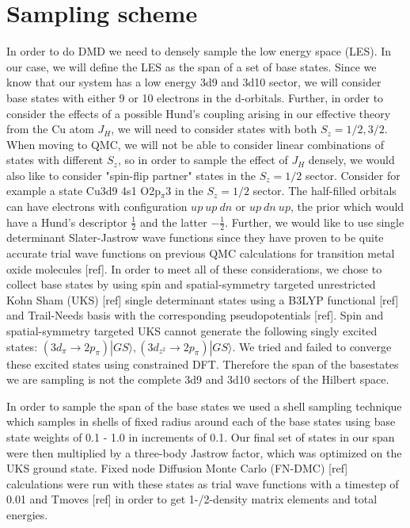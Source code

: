 \documentclass{article}
\begin{document}
\section{Sampling scheme}
In order to do DMD we need to densely sample the low energy space (LES). In our case, we will define the LES as the span of a set of base states. Since we know that our system has a low energy 3d9 and 3d10 sector, we will consider base states with either 9 or 10 electrons in the d-orbitals. Further, in order to consider the effects of a possible Hund's coupling arising in our effective theory from the Cu atom $J_H$, we will need to consider states with both $S_z=1/2, 3/2$. When moving to QMC, we will not be able to consider linear combinations of states with different $S_z$, so in order to sample the effect of $J_H$ densely, we would also like to consider "spin-flip partner" states in the $S_z=1/2$ sector. Consider for example a state Cu3d9\! 4s1 O2p$_{\pi}$3 in the $S_z=1/2$ sector. The half-filled orbitals can have electrons with configuration $up\ up\ dn$ or $up\ dn\ up$, the prior which would have a Hund's descriptor $\frac{1}{2}$ and the latter $-\frac{1}{2}$. Further, we would like to use single determinant Slater-Jastrow wave functions since they have proven to be quite accurate trial wave functions on previous QMC calculations for transition metal oxide molecules [ref]. In order to meet all of these considerations, we chose to collect base states by using spin and spatial-symmetry targeted unrestricted Kohn Sham (UKS) [ref] single determinant states using a B3LYP functional [ref] and Trail-Needs basis with the corresponding pseudopotentials [ref]. Spin and spatial-symmetry targeted UKS cannot generate the following singly excited states: $(3d_\pi \rightarrow 2p_\pi)|GS\rangle, (3d_{z^2} \rightarrow 2p_\pi)|GS\rangle$. We tried and failed to converge these excited states using constrained DFT. Therefore the span of the basestates we are sampling is not the complete 3d9 and 3d10 sectors of the Hilbert space.

In order to sample the span of the base states we used a shell sampling technique which samples in shells of fixed radius around each of the base states using base state weights of 0.1 - 1.0 in increments of 0.1. Our final set of states in our span were then multiplied by a three-body Jastrow factor, which was optimized on the UKS ground state. Fixed node Diffusion Monte Carlo (FN-DMC) [ref] calculations were run with these states as trial wave functions with a timestep of 0.01 and Tmoves [ref]  in order to get 1-/2-density matrix elements and total energies.
\end{document}

